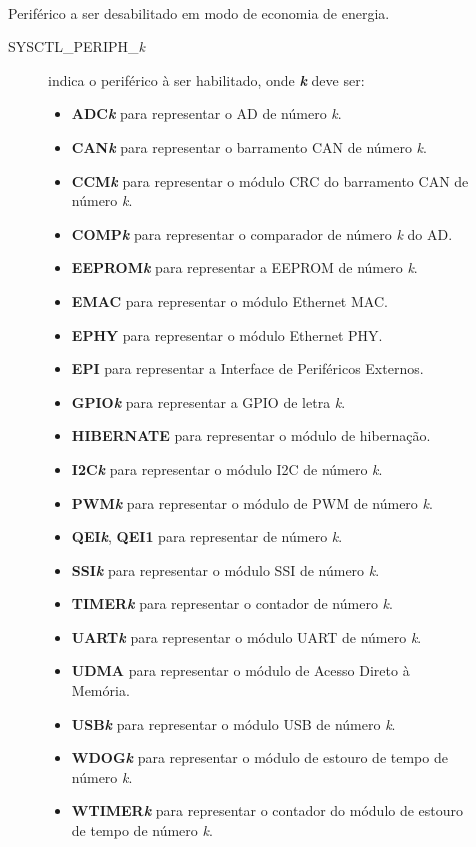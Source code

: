 \begin{description}
	\item []\hfill \\
	Periférico a ser desabilitado em modo de economia de energia.
	\begin{description}
		\item [SYSCTL\_PERIPH\_\emph{k}] indica o periférico à ser habilitado, onde \textbf{\emph{k}} deve ser:
		\begin{itemize}
			\item \textbf{ADC\emph{k}} para representar o AD de número \emph{k}.
			\item \textbf{CAN\emph{k}} para representar o barramento CAN de número \emph{k}.
			\item \textbf{CCM\emph{k}} para representar o módulo CRC do barramento CAN de número \emph{k}.
			\item \textbf{COMP\emph{k}} para representar o comparador de número \emph{k} do AD.
			\item \textbf{EEPROM\emph{k}} para representar a EEPROM de número \emph{k}.
			\item \textbf{EMAC} para representar o módulo Ethernet MAC.
			\item \textbf{EPHY} para representar o módulo Ethernet PHY.
			\item \textbf{EPI} para representar a Interface de Periféricos Externos.
			\item \textbf{GPIO\emph{k}} para representar a GPIO de letra \emph{k}.
			\item \textbf{HIBERNATE} para representar o módulo de hibernação.
			\item \textbf{I2C\emph{k}} para representar o módulo I2C de número \emph{k}.
			\item \textbf{PWM\emph{k}} para representar o módulo de PWM de número \emph{k}.
			\item \textbf{QEI\emph{k}}, \textbf{QEI1} para representar  de número \emph{k}.
			\item \textbf{SSI\emph{k}} para representar o módulo SSI de número \emph{k}.
			\item \textbf{TIMER\emph{k}} para representar o contador de número \emph{k}.
			\item \textbf{UART\emph{k}} para representar o módulo UART de número \emph{k}.
			\item \textbf{UDMA} para representar o módulo de Acesso Direto à Memória.
			\item \textbf{USB\emph{k}} para representar o módulo USB de número \emph{k}.
			\item \textbf{WDOG\emph{k}} para representar o módulo de estouro de tempo de número \emph{k}.
			\item \textbf{WTIMER\emph{k}} para representar o contador do módulo de estouro de tempo de número \emph{k}.
		\end{itemize}

	\end{description}
	
\end{description}

